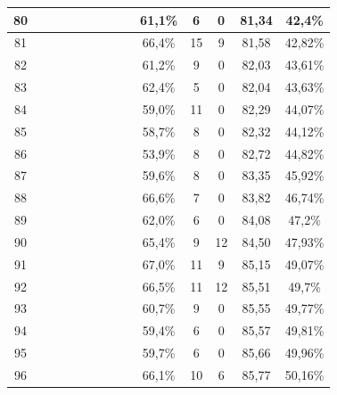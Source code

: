\begin{longtable}{|c|c|c|c|c|c|c|c|c|c|c|c|c|c|}
80  &  \x    & \x    & \x    & \x    &       & \x    &       & \x    & 61,1\% &  6  & 0  & 81,34 & 42,4\% \\ \hline
81  &  \x    & \x    &       &       & \x\m  & \x\m  &       & \x\m  & 66,4\% &  15 & 9  & 81,58 & 42,82\% \\ \hline
82  &  \x    & \x    & \x    & \x    &       &       &       & \x\m  & 61,2\% &  9  & 0  & 82,03 & 43,61\% \\ \hline
83  &  \x    & \x    & \x    &       & \x    & \x\m  & \x    &       & 62,4\% &  5  & 0  & 82,04 & 43,63\% \\ \hline
84  &  \x    & \x    &       & \x    & \x    &       &       &       & 59,0\% &  11 & 0  & 82,29 & 44,07\% \\ \hline
85  &  \x    & \x    & \x    &       &       & \x\m  &       &       & 58,7\% &  8  & 0  & 82,32 & 44,12\% \\ \hline
86  &  \x    & \x    &       & \x    &       &       &       &       & 53,9\% &  8  & 0  & 82,72 & 44,82\% \\ \hline
87  &  \x    & \x    &       &       & \x    &       &       &       & 59,6\% &  8  & 0  & 83,35 & 45,92\% \\ \hline
88  &  \x    & \x    & \x    &       & \x\m  &       & \x    &       & 66,6\% &  7  & 0  & 83,82 & 46,74\% \\ \hline
89  &  \x    & \x    & \x    &       & \x    & \x\m  &       & \x    & 62,0\% &  6  & 0  & 84,08 & 47,2\% \\ \hline
90  &  \x    & \x    &       & \x    & \x\m  & \x\m  & \x\m  &       & 65,4\% &  9  & 12 & 84,50 & 47,93\% \\ \hline
91  &  \x    & \x    &       &       & \x\m  & \x\m  &       &       & 67,0\% &  11 & 9  & 85,15 & 49,07\% \\ \hline
92  &  \x    & \x    &       & \x    & \x\m  &       &       & \x\m  & 66,5\% &  11 & 12 & 85,51 & 49,7\% \\ \hline
93  &  \x    & \x    & \x    &       &       &       & \x    &       & 60,7\% &  9  & 0  & 85,55 & 49,77\% \\ \hline
94  &  \x    & \x    & \x    &       &       & \x    &       & \x    & 59,4\% &  6  & 0  & 85,57 & 49,81\% \\ \hline
95  &  \x    & \x    & \x    &       &       &       &       & \x    & 59,7\% &  6  & 0  & 85,66 & 49,96\% \\ \hline
96  &  \x    & \x    & \x    &       & \x\m  &       & \x\m  &       & 66,1\% &  10 & 6  & 85,77 & 50,16\% \\ \hline

\end{longtable}
